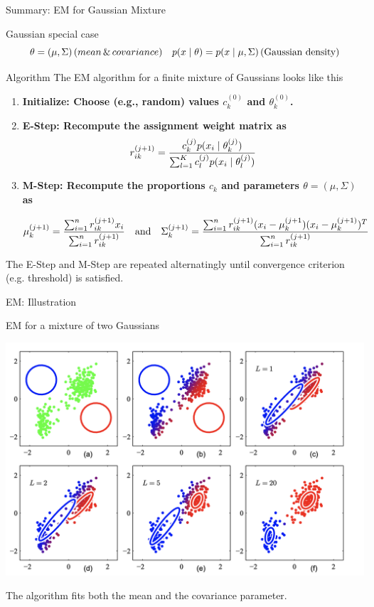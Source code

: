 \documentclass[10pt]{beamer}
\newcommand{\sumn}{\sum_{i=1}^{n}}
\newcommand{\soft}{r} %
\begin{document}
\begin{frame}{Summary: EM for Gaussian Mixture}
\footnotesize
\begin{sblock}{Gaussian special case}
\[  \theta = (\mu, \Sigma) \, \text(mean \, \& \, covariance) \quad p(x \; | \; \theta) = p(x \; | \; \mu, \Sigma) \, \text{(Gaussian density)}\]
\end{sblock}
\begin{sblock}{Algorithm}
The EM algorithm for a finite mixture of Gaussians looks like this
\begin{enumerate}
\item \bf{Initialize:} Choose (e.g., random) values $c_k^{(0)}$ and $\theta_k^{(0)}$.
\item \bf{E-Step:} Recompute the assignment weight matrix as
\[ \soft_{ik}^{(j+1)} = \df{c_k^{(j)} p(x_i \cond \theta_k^{(j)})}{ \sum_{l=1}^K c_l^{(j)} p(x_i \cond \theta_l^{(j)})}\]
\item \bf{M-Step:} Recompute the proportions $c_k$ and parameters  $\theta=(\mu, \Sigma)$ as


\[ \mu_k^{(j+1)} = \df{\sumn \soft_{ik}^{(j+1)} x_i}{ \sumn \soft_{ik}^{(j+1)}} \quad \text{and} \quad \Sigma_k^{(j+1)}= \df{ \sumn \soft_{ik}^{(j+1)}   (x_i  -\mu_k^{(j+1})  (x_i  -\mu_k^{(j+1)})^T}{ \sumn \soft_{ik}^{(j+1)}}   \] 
\end{enumerate}
The E-Step and M-Step are repeated alternatingly until convergence criterion (e.g. threshold) is satisfied.
\end{sblock}
\end{frame}

\begin{frame}{EM: Illustration}

\begin{sblock}{EM for a mixture of two Gaussians}
\begin{center}
\includegraphics[width=.6\textwidth]{images/em_for_mixture_of_two_gaussians}
\end{center}

\end{sblock}

The algorithm fits both the mean and the covariance parameter.
\end{frame}
\end{document}
